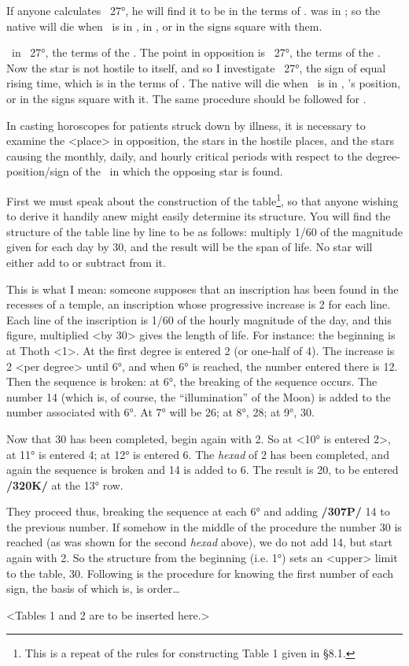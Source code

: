 If anyone calculates \Leo\, 27°, he will find it to be in the terms of \Saturn. \Saturn was in \Cancer; so the native will die when \Mars\, is in \Cancer, in \Sagittarius, or in the signs square with them.

\Venus\, in \Scorpio\, 27°, the terms of the \Sun. The point in opposition is \Taurus\, 27°, the terms of the \Sun. Now the star is not hostile to itself, and so I investigate \Scorpio\, 27°, the sign of equal rising time, which is in the terms of \Mercury. The native will die when \Venus\, is in \Virgo, \Mercury’s position, or in the signs square with it. The same procedure should be followed for \Mercury.

In casting horoscopes for patients struck down by illness, it is necessary to examine the <place> in opposition, the stars in the hostile places, and the stars causing the monthly, daily, and hourly critical periods with respect to the degree-position/sign of the \Moon\, in which the opposing star is found.

First we must speak about the construction of the table\footnote{This is a repeat of the rules for constructing Table 1 given in \S{8.1}.}, so that anyone wishing to derive it handily anew might easily determine its structure. You will find the structure of the table line by line to be as follows: multiply 1/60 of the magnitude given for each day by 30, and the result will be the span of life. No star will either add to or subtract from it.

This is what I mean: someone supposes that an inscription has been found in the recesses of a temple, an inscription whose progressive increase is 2 for each line. Each line of the inscription is 1/60 of the hourly magnitude of the day, and this figure, multiplied <by 30>
gives the length of life. For instance: the beginning is at Thoth <1>. At the first degree is entered 2 (or one-half of 4). The increase is 2 <per degree> until 6°, and when 6° is reached, the number entered there is
12. Then the sequence is broken: at 6°, the breaking of the sequence occurs. The number 14 (which is, of course, the “illumination” of the Moon) is added to the number associated with 6°. At 7° will be 26; at
8°, 28; at 9°, 30. 

Now that 30 has been completed, begin again with 2. So at <10° is entered 2>, at 11° is entered 4; at 12° is entered 6. The \textit{hexad} of 2 has been completed, and again the sequence is broken and 14 is added to 6. The result is 20, to be entered \textbf{/320K/} at the 13° row.

They proceed thus, breaking the sequence at each 6° and adding \textbf{/307P/} 14 to the previous number. If somehow in the middle of the procedure the number 30 is reached (as was shown for the second \textit{hexad} above), we do not add 14, but start again with 2. So the structure from the beginning (i.e. 1°) sets an <upper> limit to the table, 30. Following is the procedure for knowing the first number of each sign, the basis of which is, is order…

<Tables 1 and 2 are to be inserted here.>

\newpage